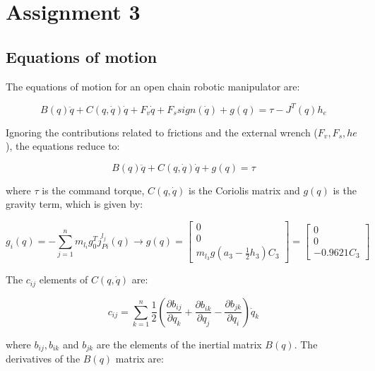 \section{Assignment 3}

\subsection{Equations of motion}

The equations of motion for an open chain robotic manipulator are:

\begin{equation*}
B(q)\ddot q+C(q,\dot q)\dot q+F_v\dot q+F_ssign(\dot q)+g(q)=\tau-J^T(q)h_e
\end{equation*}

Ignoring the contributions related to frictions and the external wrench ($F_v,F_s,he$), the equations reduce to:

\begin{equation*}
B(q)\ddot q+C(q,\dot q)\dot q+g(q)=\tau
\end{equation*}

where $\tau$ is the command torque, $C(q,\dot q)$ is the Coriolis matrix and $g(q)$ is the gravity term, which is given by:

\begin{equation*}
g_i(q)=-\sum\limits_{j=1}^nm_{l_i}g_0^Tj_{Pi}^{l_j}(q)\rightarrow g(q)=\begin{bmatrix}
0\\0\\m_{l_3}g\left(a_3-\frac{1}{2}h_3\right)C_3
\end{bmatrix}=\begin{bmatrix}
0\\0\\ -0.9621C_3
\end{bmatrix}
\end{equation*}

The $c_{ij}$ elements of $C(q,\dot q)$ are:

\begin{equation*}
c_{ij}=\sum\limits_{k=1}^n\frac{1}{2}\left(\frac{\partial b_{ij}}{\partial q_k}+\frac{\partial b_{ik}}{\partial q_j}-\frac{\partial b_{jk}}{\partial q_i}\right)\dot q_k
\end{equation*}

where $b_{ij},b_{ik}$ and $b_{jk}$ are the elements of the inertial matrix $B(q)$. The derivatives of the $B(q)$ matrix are:

